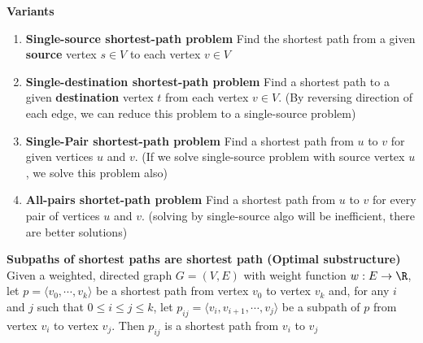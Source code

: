 \documentclass[11pt]{article}
\begin{document}
\begin{defn*}
    \textbf{Variants}
    \begin{enumerate}
        \item \textbf{Single-source shortest-path problem} Find the shortest path from a given \textbf{source} vertex $s\in V$ to each vertex $v\in V$
        \item \textbf{Single-destination shortest-path problem} Find a shortest path to a given \textbf{destination} vertex $t$ from each vertex $v\in V$. (By reversing direction of each edge, we can reduce this problem to a single-source problem)
        \item \textbf{Single-Pair shortest-path problem} Find a shortest path from $u$ to $v$ for given vertices $u$ and $v$. (If we solve single-source problem with source vertex $u$, we solve this problem also)
        \item \textbf{All-pairs shortet-path problem} Find a shortest path from $u$ to $v$ for every pair of vertices $u$ and $v$. (solving by single-source algo will be inefficient, there are better solutions)
    \end{enumerate}
\end{defn*}




\begin{proposition*}
    \textbf{Subpaths of shortest paths are shortest path (Optimal substructure)} Given a weighted, directed graph $G = (V,E)$ with weight function $w: E\to \R$, let $p = \langle v_0,\cdots, v_k \rangle$ be a shortest path from vertex $v_0$ to vertex $v_k$ and, for any $i$ and $j$ such that $0 \leq i \leq j \leq k$, let $p_{ij} = \langle v_i, v_{i+1}, \cdots, v_j \rangle$ be a subpath of $p$ from vertex $v_i$ to vertex $v_j$. Then $p_{ij}$ is a shortest path from $v_i$ to $v_j$
\end{proposition*}
\end{document}
